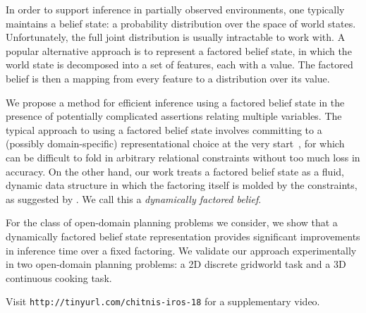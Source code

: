 In order to support inference in partially observed environments, one
typically maintains a belief state: a probability distribution over
the space of world states. Unfortunately, the full joint distribution
is usually intractable to work with. A popular alternative approach is
to represent a factored belief state, in which the world state is
decomposed into a set of features, each with a value. The factored
belief is then a mapping from every feature to a distribution over its
value.

We propose a method for efficient inference using a factored belief
state in the presence of potentially complicated assertions relating
multiple variables. The typical approach to using a factored belief
state involves committing to a (possibly domain-specific)
representational choice at the very
start~\cite{bonet2014belief,boyenkoller,sallans2000learning}, for
which can be difficult to fold in arbitrary relational constraints
without too much loss in accuracy. On the other hand, our work treats
a factored belief state as a fluid, dynamic data structure in which
the factoring itself is molded by the constraints, as suggested by
. We call this a \emph{dynamically factored
  belief}.

For the class of open-domain planning problems we consider, we show
that a dynamically factored belief state representation provides
significant improvements in inference time over a fixed factoring. We
validate our approach experimentally in two open-domain planning
problems: a 2D discrete gridworld task and a 3D continuous cooking
task.

Visit \texttt{http://tinyurl.com/chitnis-iros-18} for a supplementary
video.
